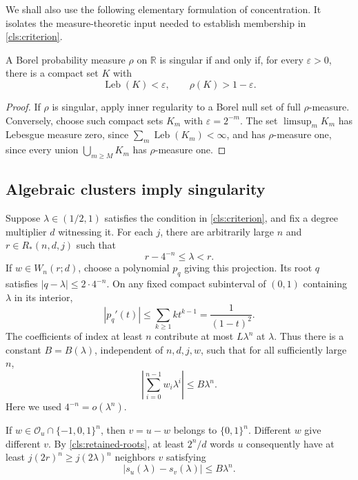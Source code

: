 We shall also use the following elementary formulation of concentration.
It isolates the measure-theoretic input needed to establish membership in
\eqref{cls:criterion}.

\begin{lemma}\label{cls:compact-concentration}
A Borel probability measure $\rho$ on $\mathbb R$ is singular if and
only if, for every $\varepsilon>0$, there is a compact set $K$ with
\[
  \operatorname{Leb}(K)<\varepsilon,
  \qquad \rho(K)>1-\varepsilon.
\]
\end{lemma}

\begin{proof}
If $\rho$ is singular, apply inner regularity to a Borel null set of full
$\rho$-measure.  Conversely, choose such compact sets $K_m$ with
$\varepsilon=2^{-m}$.  The set $\limsup_m K_m$ has Lebesgue measure
zero, since $\sum_m\operatorname{Leb}(K_m)<\infty$, and has
$\rho$-measure one, since every union $\bigcup_{m\geq M}K_m$ has
$\rho$-measure one.
\end{proof}

\subsection{Algebraic clusters imply singularity}
\label{cls:subsection-forward}

Suppose $\lambda\in(1/2,1)$ satisfies the condition in
\eqref{cls:criterion}, and fix a degree multiplier $d$ witnessing it.
For each $j$, there are arbitrarily large $n$ and
$r\in R_*(n,d,j)$ such that
\[
  r-4^{-n}\leq\lambda<r.
\]
If $w\in W_n(r;d)$, choose a polynomial $p_q$ giving this projection.
Its root $q$ satisfies $|q-\lambda|\leq2\cdot4^{-n}$.  On any fixed
compact subinterval of $(0,1)$ containing $\lambda$ in its interior,
\[
  |p_q'(t)|\leq\sum_{k\geq1}k t^{k-1}=\frac1{(1-t)^2}.
\]
The coefficients of index at least $n$ contribute at most
$L\lambda^n$ at $\lambda$.  Thus there is a constant $B=B(\lambda)$,
independent of $n,d,j,w$, such that for all sufficiently large $n$,
\begin{equation}
  \left|\sum_{i=0}^{n-1}w_i\lambda^i\right|\leq B\lambda^n.
  \label{cls:slab}
\end{equation}
Here we used $4^{-n}=o(\lambda^n)$.

If $w\in\mathcal O_u\cap\{-1,0,1\}^n$, then $v=u-w$ belongs to
$\{0,1\}^n$.  Different $w$ give different $v$.  By
\eqref{cls:retained-roots}, at least $2^n/d$ words $u$ consequently have
at least $j(2r)^n\geq j(2\lambda)^n$ neighbors $v$ satisfying
\[
  |s_u(\lambda)-s_v(\lambda)|\leq B\lambda^n.
\]

